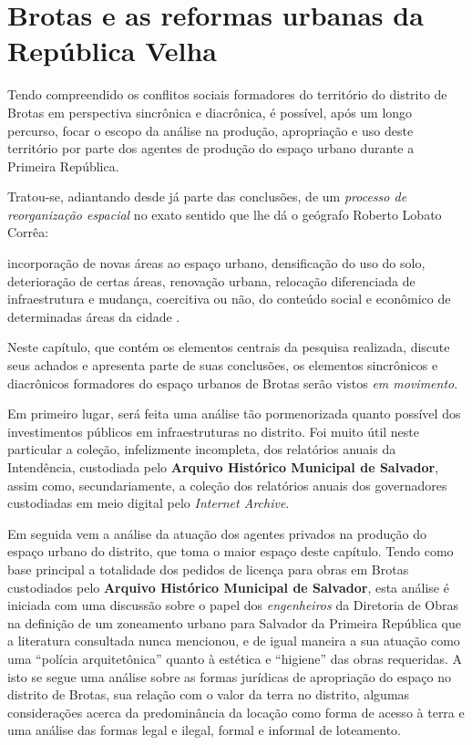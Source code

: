 \chapter{Brotas e as reformas urbanas da República Velha}\label{cap:3}

Tendo compreendido os conflitos sociais formadores do território do distrito de Brotas em perspectiva sincrônica e diacrônica, é possível, após um longo percurso, focar o escopo da análise na produção, apropriação e uso deste território por parte dos agentes de produção do espaço urbano durante a Primeira República. 

Tratou-se, adiantando desde já parte das conclusões, de um \textit{processo de reorganização espacial} no exato sentido que lhe dá o geógrafo Roberto Lobato Corrêa:

\begin{citacao}
incorporação de novas áreas ao espaço urbano, densificação do uso do solo, deterioração de certas áreas, renovação urbana, relocação diferenciada de infraestrutura e mudança, coercitiva ou não, do conteúdo social e econômico de determinadas áreas da cidade \cite[p.~7]{CORREA1985espa}.
\end{citacao}

Neste capítulo, que contém os elementos centrais da pesquisa realizada, discute seus achados e apresenta parte de suas conclusões, os elementos sincrônicos e diacrônicos formadores do espaço urbanos de Brotas serão vistos \textit{em movimento}. 

Em primeiro lugar, será feita uma análise tão pormenorizada quanto possível dos investimentos públicos em infraestruturas no distrito. Foi muito útil neste particular a coleção, infelizmente incompleta, dos relatórios anuais da Intendência, custodiada pelo \textbf{Arquivo Histórico Municipal de Salvador}, assim como, secundariamente, a coleção dos relatórios anuais dos governadores custodiadas em meio digital pelo \textit{Internet Archive}. 

Em seguida vem a análise da atuação dos agentes privados na produção do espaço urbano do distrito, que toma o maior espaço deste capítulo. Tendo como base principal a totalidade dos pedidos de licença para obras em Brotas custodiados pelo \textbf{Arquivo Histórico Municipal de Salvador}, esta análise é iniciada com uma discussão sobre o papel dos \textit{engenheiros} da Diretoria de Obras na definição de um zoneamento urbano para Salvador da Primeira República que a literatura consultada nunca mencionou, e de igual maneira a sua atuação como uma ``polícia arquitetônica'' quanto à estética e ``higiene'' das obras requeridas. A isto se segue uma análise sobre as formas jurídicas de apropriação do espaço no distrito de Brotas, sua relação com o valor da terra no distrito, algumas considerações acerca da predominância da locação como forma de acesso à terra e uma análise das formas legal e ilegal, formal e informal de loteamento. 

